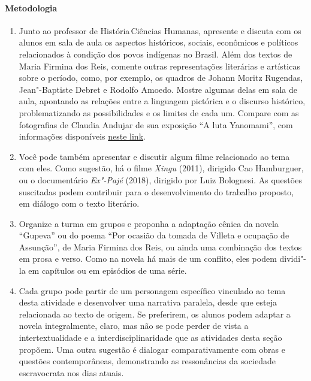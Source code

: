 \documentclass[12pt]{extarticle}
\begin{document}
\paragraph{Metodologia} 
\begin{enumerate}
\item
Junto ao professor de História\,Ciências Humanas, apresente 
e discuta com os alunos em sala de aula os aspectos históricos, 
sociais, econômicos e políticos
relacionados à condição dos povos indígenas no Brasil. Além dos textos
de Maria Firmina dos Reis, comente outras representações literárias e
artísticas sobre o período, como, por exemplo, os quadros de Johann
Moritz Rugendas, Jean"-Baptiste Debret e Rodolfo Amoedo. Mostre algumas
delas em sala de aula, apontando as relações entre a linguagem pictórica
e o discurso histórico, problematizando as possibilidades e os limites
de cada um. Compare com as fotografias de Claudia Andujar de sua
exposição ``A luta Yanomami'', com informações disponíveis \href{https://ims.com.br/exposicao/claudia-andujar-a-luta-yanomami-ims-paulista/}{neste link}.



\item
Você pode também apresentar e discutir algum filme relacionado ao
tema com eles. Como sugestão, há o filme \emph{Xingu} (2011), dirigido
Cao Hamburguer, ou o documentário \emph{Ex"-Pajé} (2018), dirigido por
Luiz Bolognesi. As questões suscitadas podem contribuir para o
desenvolvimento do trabalho proposto, em diálogo com o texto literário.

\item
Organize a turma em grupos e proponha a adaptação cênica da novela
``Gupeva'' ou do poema ``Por ocasião da tomada de Villeta e ocupação de
Assunção'', de Maria Firmina dos Reis, ou ainda uma combinação dos
textos em prosa e verso. Como na novela há mais de um conflito, eles
podem dividi"-la em capítulos ou em episódios de uma série.

\item
Cada grupo pode partir de um personagem específico vinculado ao tema
desta atividade e desenvolver uma narrativa paralela, desde que esteja
relacionada ao texto de origem. Se preferirem, os alunos podem adaptar a
novela integralmente, claro, mas não se pode perder de vista a
intertextualidade e a interdisciplinaridade que as atividades desta
seção propõem. Uma outra sugestão é dialogar comparativamente com obras
e questões contemporâneas, demonstrando as ressonâncias da sociedade
escravocrata nos dias atuais.


\end{enumerate}
\end{document}
